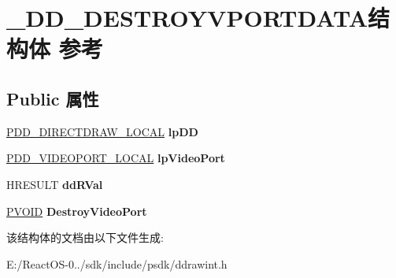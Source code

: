 \hypertarget{struct___d_d___d_e_s_t_r_o_y_v_p_o_r_t_d_a_t_a}{}\section{\+\_\+\+D\+D\+\_\+\+D\+E\+S\+T\+R\+O\+Y\+V\+P\+O\+R\+T\+D\+A\+T\+A结构体 参考}
\label{struct___d_d___d_e_s_t_r_o_y_v_p_o_r_t_d_a_t_a}
\subsection*{Public 属性}
\begin{DoxyCompactItemize}
\item 
\mbox{\label{struct___d_d___d_e_s_t_r_o_y_v_p_o_r_t_d_a_t_a_a0c14cedaf385a92009a6b9a9606e91ab}} 
\hyperlink{struct___d_d___d_i_r_e_c_t_d_r_a_w___l_o_c_a_l}{P\+D\+D\+\_\+\+D\+I\+R\+E\+C\+T\+D\+R\+A\+W\+\_\+\+L\+O\+C\+AL} {\bfseries lp\+DD}
\item 
\mbox{\label{struct___d_d___d_e_s_t_r_o_y_v_p_o_r_t_d_a_t_a_aff70779a8dd907d3f0ce98052b9f5e68}} 
\hyperlink{struct___d_d___v_i_d_e_o_p_o_r_t___l_o_c_a_l}{P\+D\+D\+\_\+\+V\+I\+D\+E\+O\+P\+O\+R\+T\+\_\+\+L\+O\+C\+AL} {\bfseries lp\+Video\+Port}
\item 
\mbox{\label{struct___d_d___d_e_s_t_r_o_y_v_p_o_r_t_d_a_t_a_a1125d240609db59d1e38400c405a24b4}} 
H\+R\+E\+S\+U\+LT {\bfseries dd\+R\+Val}
\item 
\mbox{\label{struct___d_d___d_e_s_t_r_o_y_v_p_o_r_t_d_a_t_a_aa8e39c78bdf762153ec0a333f5256b36}} 
\hyperlink{interfacevoid}{P\+V\+O\+ID} {\bfseries Destroy\+Video\+Port}
\end{DoxyCompactItemize}


该结构体的文档由以下文件生成\+:\begin{DoxyCompactItemize}
\item 
E\+:/\+React\+O\+S-\/0../sdk/include/psdk/ddrawint.\+h\end{DoxyCompactItemize}
